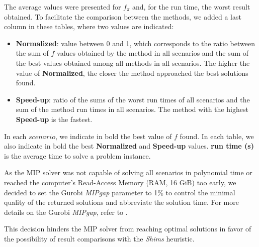 \documentclass[preprint]{elsarticle}
\begin{document}
The average values were presented for $f_{\pi}$\/ and, for the run time, the worst result obtained. To facilitate the comparison between the methods, we added a last column in these tables, where two values are indicated:
\begin{itemize}
	\item {\bf Normalized}: value between 0 and 1, which corresponds to the ratio between the sum of $f$\/ values obtained by the method in all scenarios and the sum of the best values obtained among all methods in all scenarios. The higher the value of {\bf Normalized}, the closer the method approached the best solutions found.
	\item {\bf Speed-up}: ratio of the sums of the worst run times of all scenarios and the sum of the method run times in all scenarios. The method with the highest {\bf Speed-up}\/ is the fastest.
\end{itemize}

In each $scenario$\/, we indicate in bold the best value of $f$\/ found. In each table, we also indicate in bold the best {\bf Normalized}\/ and {\bf Speed-up}\/ values.
{\bf run time (s)} is the average time to solve a problem instance.

{\color{blue}

As the MIP solver was not capable of solving all scenarios in polynomial time or reached the computer's Read-Access Memory (RAM, 16 GiB) too early, we decided to set the Gurobi {\it MIPgap} parameter to 1\% to control the minimal quality of the returned solutions and abbreviate the solution time.
For more details on the Gurobi {\it MIPgap}, refer to \cite{mipgap}.

This decision hinders the MIP solver from reaching optimal solutions in favor of the possibility of result comparisons with the {\it Shims} heuristic.

}
\end{document}
